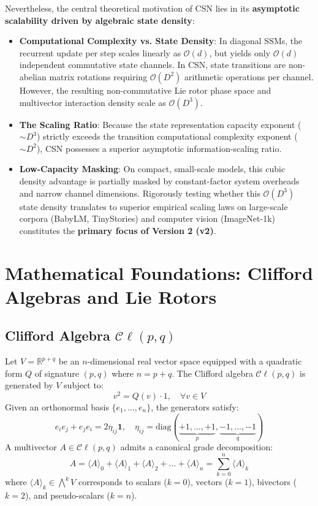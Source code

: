 \documentclass[11pt,a4paper]{article}
\newcommand{\Cl}{\mathcal{C}\ell}
\begin{document}
Nevertheless, the central theoretical motivation of CSN lies in its \textbf{asymptotic scalability driven by algebraic state density}:
\begin{itemize}[leftmargin=*]
    \item \textbf{Computational Complexity vs. State Density}: In diagonal SSMs, the recurrent update per step scales linearly as $\mathcal{O}(d)$, but yields only $\mathcal{O}(d)$ independent commutative state channels. In CSN, state transitions are non-abelian matrix rotations requiring $\mathcal{O}(D^2)$ arithmetic operations per channel. However, the resulting non-commutative Lie rotor phase space and multivector interaction density scale as $\mathcal{O}(D^3)$.
    \item \textbf{The Scaling Ratio}: Because the state representation capacity exponent ($\sim D^3$) strictly exceeds the transition computational complexity exponent ($\sim D^2$), CSN possesses a superior asymptotic information-scaling ratio. 
    \item \textbf{Low-Capacity Masking}: On compact, small-scale models, this cubic density advantage is partially masked by constant-factor system overheads and narrow channel dimensions. Rigorously testing whether this $\mathcal{O}(D^3)$ state density translates to superior empirical scaling laws on large-scale corpora (BabyLM, TinyStories) and computer vision (ImageNet-1k) constitutes the \textbf{primary focus of Version 2 (v2)}.
\end{itemize}

\section{Mathematical Foundations: Clifford Algebras and Lie Rotors}

\subsection{Clifford Algebra $\Cl(p, q)$}

Let $V = \mathbb{R}^{p+q}$ be an $n$-dimensional real vector space equipped with a quadratic form $Q$ of signature $(p, q)$ where $n = p + q$. The Clifford algebra $\Cl(p, q)$ is generated by $V$ subject to:
\begin{equation}
    v^2 = Q(v) \cdot 1, \quad \forall v \in V
\end{equation}
Given an orthonormal basis $\{e_1, \dots, e_n\}$, the generators satisfy:
\begin{equation}
    e_i e_j + e_j e_i = 2 \eta_{ij} \mathbf{1}, \quad \eta_{ij} = \mathrm{diag}(\underbrace{+1, \dots, +1}_{p}, \underbrace{-1, \dots, -1}_{q})
\end{equation}
A multivector $A \in \Cl(p, q)$ admits a canonical grade decomposition:
\begin{equation}
    A = \langle A \rangle_0 + \langle A \rangle_1 + \langle A \rangle_2 + \dots + \langle A \rangle_n = \sum_{k=0}^n \langle A \rangle_k
\end{equation}
where $\langle A \rangle_k \in \bigwedge^k V$ corresponds to scalars ($k=0$), vectors ($k=1$), bivectors ($k=2$), and pseudo-scalars ($k=n$).
\end{document}

